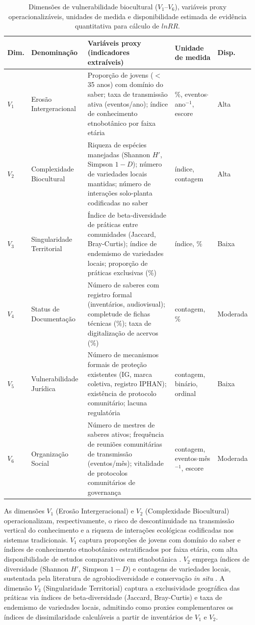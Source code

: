 \begin{table}[htbp]
\caption{Dimensões de vulnerabilidade biocultural ($V_1$--$V_6$), variáveis proxy operacionalizáveis, unidades de medida e disponibilidade estimada de evidência quantitativa para cálculo de $lnRR$.}
\label{tab:proxies_cap2}
\centering
\footnotesize
\begin{tabular}{p{0.8cm}p{2.2cm}p{4.5cm}p{2.5cm}p{1.5cm}}
\toprule
\textbf{Dim.} & \textbf{Denominação} & \textbf{Variáveis proxy (indicadores extraíveis)} & \textbf{Unidade de medida} & \textbf{Disp.} \\
\midrule
$V_1$ & Erosão Intergeracional & Proporção de jovens ($<$ 35 anos) com domínio do saber; taxa de transmissão ativa (eventos/ano); índice de conhecimento etnobotânico por faixa etária & \%, eventos$\cdot$ano$^{-1}$, escore & Alta \\
$V_2$ & Complexidade Biocultural & Riqueza de espécies manejadas (Shannon $H'$, Simpson $1-D$); número de variedades locais mantidas; número de interações solo-planta codificadas no saber & índice, contagem & Alta \\
$V_3$ & Singularidade Territorial & Índice de beta-diversidade de práticas entre comunidades (Jaccard, Bray-Curtis); índice de endemismo de variedades locais; proporção de práticas exclusivas (\%) & índice, \% & Baixa \\
$V_4$ & Status de Documentação & Número de saberes com registro formal (inventários, audiovisual); completude de fichas técnicas (\%); taxa de digitalização de acervos (\%) & contagem, \% & Moderada \\
$V_5$ & Vulnerabilidade Jurídica & Número de mecanismos formais de proteção existentes (IG, marca coletiva, registro IPHAN); existência de protocolo comunitário; lacuna regulatória & contagem, binário, ordinal & Baixa \\
$V_6$ & Organização Social & Número de mestres de saberes ativos; frequência de reuniões comunitárias de transmissão (eventos/mês); vitalidade de protocolos comunitários de governança & contagem, eventos$\cdot$mês$^{-1}$, escore & Moderada \\
\bottomrule
\end{tabular}
\end{table}

As dimensões $V_1$ (Erosão Intergeracional) e $V_2$ (Complexidade Biocultural) operacionalizam, respectivamente, o risco de descontinuidade na transmissão vertical do conhecimento e a riqueza de interações ecológicas codificadas nos sistemas tradicionais. $V_1$ captura proporções de jovens com domínio do saber e índices de conhecimento etnobotânico estratificados por faixa etária, com alta disponibilidade de estudos comparativos em etnobotânica \cite{ReyesGarcia2013,GomezBaggethun2013}. $V_2$ emprega índices de diversidade (Shannon $H'$, Simpson $1-D$) e contagens de variedades locais, sustentada pela literatura de agrobiodiversidade e conservação \textit{in situ} \cite{Jarvis2008,Brush2004}. A dimensão $V_3$ (Singularidade Territorial) captura a exclusividade geográfica das práticas via índices de beta-diversidade (Jaccard, Bray-Curtis) e taxa de endemismo de variedades locais, admitindo como proxies complementares os índices de dissimilaridade calculáveis a partir de inventários de $V_1$ e $V_2$.

